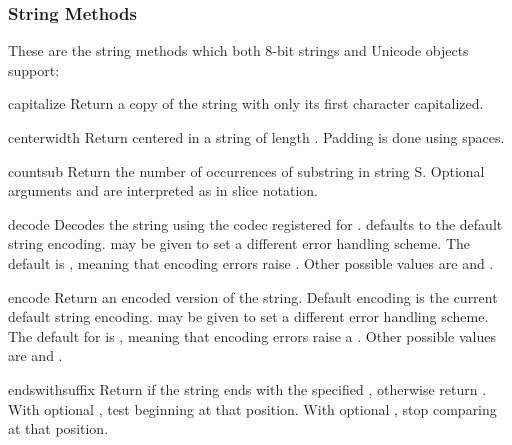 \subsubsection{String Methods \label{string-methods}}

These are the string methods which both 8-bit strings and Unicode
objects support:

\begin{methoddesc}[string]{capitalize}{}
Return a copy of the string with only its first character capitalized.
\end{methoddesc}

\begin{methoddesc}[string]{center}{width}
Return centered in a string of length . Padding is done
using spaces.
\end{methoddesc}

\begin{methoddesc}[string]{count}{sub}
Return the number of occurrences of substring  in string
S.  Optional arguments  and
 are interpreted as in slice notation.
\end{methoddesc}

\begin{methoddesc}[string]{decode}{}
Decodes the string using the codec registered for .
 defaults to the default string encoding.  
may be given to set a different error handling scheme.  The default is
, meaning that encoding errors raise
.  Other possible values are  and
.
\end{methoddesc}

\begin{methoddesc}[string]{encode}{}
Return an encoded version of the string.  Default encoding is the current
default string encoding.   may be given to set a different
error handling scheme.  The default for  is
, meaning that encoding errors raise a
.  Other possible values are  and
.
\end{methoddesc}

\begin{methoddesc}[string]{endswith}{suffix}
Return  if the string ends with the specified ,
otherwise return .  With optional , test beginning at
that position.  With optional , stop comparing at that position.
\end{methoddesc}

